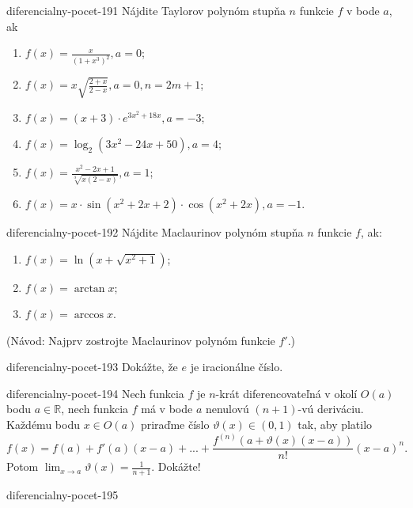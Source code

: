\begin{defproblem}{diferencialny-pocet-191}
Nájdite Taylorov polynóm stupňa $n$ funkcie $f$ v bode $a$, ak
\begin{multicols}{2}
\begin{enumerate}
    \item $f(x)=\frac{x}{(1+x^3)^2},a=0$;
	\item $f(x)=x\sqrt{\frac{2+x}{2-x}},a=0,n=2m+1$;
	\item $f(x)=(x+3)\cdot e^{3x^2+18x},a=-3$;
	\item $f(x)=\log_2(3x^2-24x+50),a=4$;
	\item $f(x)=\frac{x^2-2x+1}{\sqrt[3]{x(2-x)}},a=1$;
	\item $f(x)=x\cdot\sin (x^2+2x+2)\cdot\cos (x^2+2x),a=-1$.
\end{enumerate}
\end{multicols}
\end{defproblem}

\begin{defproblem}{diferencialny-pocet-192}
Nájdite Maclaurinov polynóm stupňa $n$ funkcie $f$, ak:
\begin{multicols}{2}
\begin{enumerate}
	\item $f(x)=\ln (x+\sqrt{x^2+1})$;
	\item $f(x)=\arctan x$;
	\item $f(x)=\arccos x$.
\end{enumerate}
\end{multicols}
(Návod: Najprv zostrojte Maclaurinov polynóm funkcie $f'$.)
\end{defproblem}

\begin{defproblem}{diferencialny-pocet-193}
Dokážte, že $e$ je iracionálne číslo.
\end{defproblem}

\begin{defproblem}{diferencialny-pocet-194}
Nech funkcia $f$ je $n$-krát diferencovateľná v okolí $O(a)$ bodu $a\in\mathbb{R}$, nech funkcia $f$ má v bode $a$ nenulovú $(n+1)$-vú deriváciu. Každému bodu $x\in O(a)$ priraďme číslo $\vartheta (x)\in (0,1)$ tak, aby platilo 
$$f(x)=f(a)+f'(a)(x-a)+...+\frac{f^{(n)}(a+\vartheta (x)(x-a))}{n!}(x-a)^n.$$
Potom $\lim_{x\rightarrow a}\vartheta (x)=\frac{1}{n+1}$. Dokážte!
\end{defproblem}

\begin{defproblem}{diferencialny-pocet-195}

\end{defproblem}


